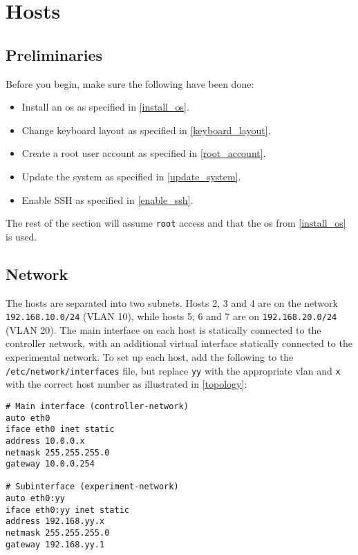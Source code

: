 \chapter{Hosts}


\section{Preliminaries}

Before you begin, make sure the following have been done:

\begin{itemize}
    \item Install an \gls{os} as specified in \ref{install_os}.
    \item Change keyboard layout as specified in \ref{keyboard_layout}.
    \item Create a root user account as specified in \ref{root_account}.
    \item Update the system as specified in \ref{update_system}.
    \item Enable SSH as specified in \ref{enable_ssh}.
\end{itemize}

The rest of the section will assume \lstinline{root} access and that the \gls{os} from \ref{install_os} is used.


\section{Network}

The hosts are separated into two subnets. Hosts 2, 3 and 4 are on the network \lstinline{192.168.10.0/24} (VLAN 10), while hosts 5, 6 and 7 are on \lstinline{192.168.20.0/24} (VLAN 20). The main interface on each host is statically connected to the controller network, with an additional virtual interface statically connected to the experimental network. To set up each host, add the following to the \lstinline{/etc/network/interfaces} file, but replace \lstinline{yy} with the appropriate \gls{vlan} and \lstinline{x} with the correct host number as illustrated in \ref{topology}:

\begin{lstlisting}
# Main interface (controller-network)
auto eth0
iface eth0 inet static
address 10.0.0.x
netmask 255.255.255.0
gateway 10.0.0.254

# Subinterface (experiment-network)
auto eth0:yy
iface eth0:yy inet static
address 192.168.yy.x
netmask 255.255.255.0
gateway 192.168.yy.1
\end{lstlisting}

